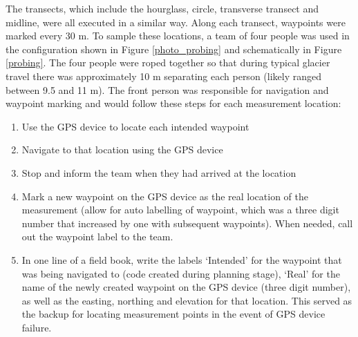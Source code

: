 \documentclass{sfuthesis}
\begin{document}
The transects, which include the hourglass, circle, transverse transect and midline, were all executed in a similar way. Along each transect, waypoints were marked every 30 m. To sample these locations, a team of four people was used in the configuration shown in Figure \ref{photo_probing} and schematically in Figure \ref{probing}. The four people were roped together so that during typical glacier travel there was approximately 10 m separating each person (likely ranged between 9.5 and 11 m). The front person was responsible for navigation and waypoint marking and would follow these steps for each measurement location:
\begin{enumerate}
\item Use the GPS device to locate each intended waypoint
\item Navigate to that location using the GPS device
\item Stop and inform the team when they had arrived at the location
\item Mark a new waypoint on the GPS device as the real location of the measurement (allow for auto labelling of waypoint, which was a three digit number that increased by one with subsequent waypoints). When needed, call out the waypoint label to the team.
\item In one line of a field book, write the labels `Intended' for the waypoint that was being navigated to (code created during planning stage), `Real' for the name of the newly created waypoint on the GPS device (three digit number), as well as the easting, northing and elevation for that location. This served as the backup for locating measurement points in the event of GPS device failure. 
\end{enumerate}
\end{document}
